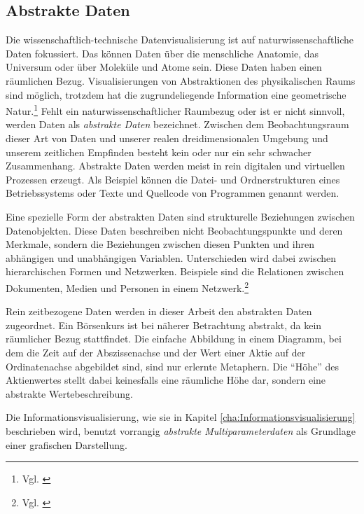 \documentclass[a4paper, 
               12pt,
               DIV=calc,
               version=first,
               pdftex,
               headsepline,
               footsepline,
               bibtotocnumbered,
               liststotocnumbered]{scrreprt}
\begin{document}
\subsection{Abstrakte Daten}
Die wissenschaftlich-technische Datenvisualisierung ist auf naturwissenschaftliche Daten fokussiert.
Das können Daten über die menschliche Anatomie, das Universum oder über Moleküle und Atome sein. Diese Daten
haben einen räumlichen Bezug. Visualisierungen von Abstraktionen des physikalischen Raums
sind möglich, trotzdem hat die zugrundeliegende Information eine geometrische Natur.\footnote{Vgl. \citep[S.\,6]{Card}}
Fehlt ein naturwissenschaftlicher Raumbezug oder ist er nicht sinnvoll, werden Daten als \textit{abstrakte Daten} bezeichnet.
Zwischen dem Beobachtungsraum dieser Art von Daten und unserer realen dreidimensionalen Umgebung und unserem zeitlichen Empfinden
besteht kein oder nur ein sehr schwacher Zusammenhang.
Abstrakte Daten werden meist in rein digitalen und virtuellen Prozessen erzeugt. Als Beispiel
können die Datei- und Ordnerstrukturen eines Betriebssystems oder Texte und Quellcode von Programmen genannt werden.

Eine spezielle Form der abstrakten Daten sind strukturelle Beziehungen zwischen Datenobjekten.
Diese Daten beschreiben nicht Beobachtungspunkte und deren Merkmale, sondern die Beziehungen
zwischen diesen Punkten und ihren abhängigen und unabhängigen Variablen. Unterschieden wird dabei
zwischen hierarchischen Formen und Netzwerken. Beispiele sind die Relationen zwischen Dokumenten,
Medien und Personen in einem Netzwerk.\footnote{Vgl. \citep{Preim}}

Rein zeitbezogene Daten werden in dieser Arbeit den abstrakten Daten zugeordnet. Ein Börsenkurs ist bei näherer Betrachtung
abstrakt, da kein räumlicher Bezug stattfindet.
Die einfache Abbildung in einem Diagramm, bei dem die Zeit auf der Abszissenachse und der Wert einer Aktie auf der Ordinatenachse
abgebildet sind, sind nur erlernte Metaphern. Die "`Höhe"' des Aktienwertes stellt dabei keinesfalls eine räumliche
Höhe dar, sondern eine abstrakte Wertebeschreibung.

Die Informationsvisualisierung, wie sie in Kapitel \ref{cha:Informationsvisualisierung} beschrieben wird, benutzt
vorrangig \textit{abstrakte Multiparameterdaten} als Grundlage einer grafischen Darstellung.
\end{document}
